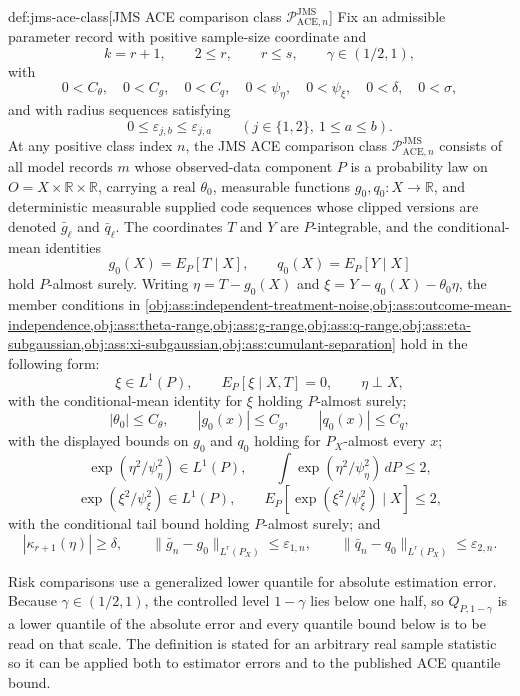 \documentclass[11pt]{article}
\begin{document}
\begin{definitionv}{def:jms-ace-class}[JMS ACE comparison class \(\mathcal P_{\mathrm{ACE},n}^{\mathrm{JMS}}\)]
Fix an admissible parameter record with positive sample-size coordinate and
\[
k=r+1,\qquad 2\le r,\qquad r\le s,\qquad \gamma\in(1/2,1),
\]
with
\[
0<C_{\theta},\quad 0<C_g,\quad 0<C_q,\quad
0<\psi_{\eta},\quad 0<\psi_{\xi},\quad 0<\delta,
\quad 0<\sigma,
\]
and with radius sequences satisfying
\[
0\le \varepsilon_{j,b}\le \varepsilon_{j,a}
\qquad (j\in\{1,2\},\ 1\le a\le b).
\]
At any positive class index \(n\), the JMS ACE comparison class \(\mathcal P_{\mathrm{ACE},n}^{\mathrm{JMS}}\) consists of all model records \(m\) whose observed-data component \(P\) is a probability law on \(O=X\times\mathbb R\times\mathbb R\), carrying a real \(\theta_0\), measurable functions \(g_0,q_0:X\to\mathbb R\), and deterministic measurable supplied code sequences whose clipped versions are denoted \(\bar g_\ell\) and \(\bar q_\ell\). The coordinates \(T\) and \(Y\) are \(P\)-integrable, and the conditional-mean identities
\[
g_0(X)=E_P[T\mid X],\qquad q_0(X)=E_P[Y\mid X]
\]
hold \(P\)-almost surely. Writing \(\eta=T-g_0(X)\) and \(\xi=Y-q_0(X)-\theta_0\eta\), the member conditions in \cref{obj:ass:independent-treatment-noise,obj:ass:outcome-mean-independence,obj:ass:theta-range,obj:ass:g-range,obj:ass:q-range,obj:ass:eta-subgaussian,obj:ass:xi-subgaussian,obj:ass:cumulant-separation} hold in the following form:
\[
\xi\in L^1(P),\qquad E_P[\xi\mid X,T]=0,\qquad \eta\perp X,
\]
with the conditional-mean identity for \(\xi\) holding \(P\)-almost surely;
\[
|\theta_0|\le C_{\theta},\qquad |g_0(x)|\le C_g,
\qquad |q_0(x)|\le C_q,
\]
with the displayed bounds on \(g_0\) and \(q_0\) holding for \(P_X\)-almost every \(x\);
\[
\exp(\eta^2/\psi_{\eta}^2)\in L^1(P),\qquad
\int \exp(\eta^2/\psi_{\eta}^2)\,dP\le 2,
\]
\[
\exp(\xi^2/\psi_{\xi}^2)\in L^1(P),\qquad
E_P[\exp(\xi^2/\psi_{\xi}^2)\mid X]\le 2,
\]
with the conditional tail bound holding \(P\)-almost surely; and
\[
|\kappa_{r+1}(\eta)|\ge\delta,\qquad
\|\bar g_n-g_0\|_{L^r(P_X)}\le\varepsilon_{1,n},\qquad
\|\bar q_n-q_0\|_{L^r(P_X)}\le\varepsilon_{2,n}.
\]
\end{definitionv}

Risk comparisons use a generalized lower quantile for absolute estimation error. Because \(\gamma\in(1/2,1)\), the controlled level \(1-\gamma\) lies below one half, so \(Q_{P,1-\gamma}\) is a lower quantile of the absolute error and every quantile bound below is to be read on that scale. The definition is stated for an arbitrary real sample statistic so it can be applied both to estimator errors and to the published ACE quantile bound.
\end{document}
